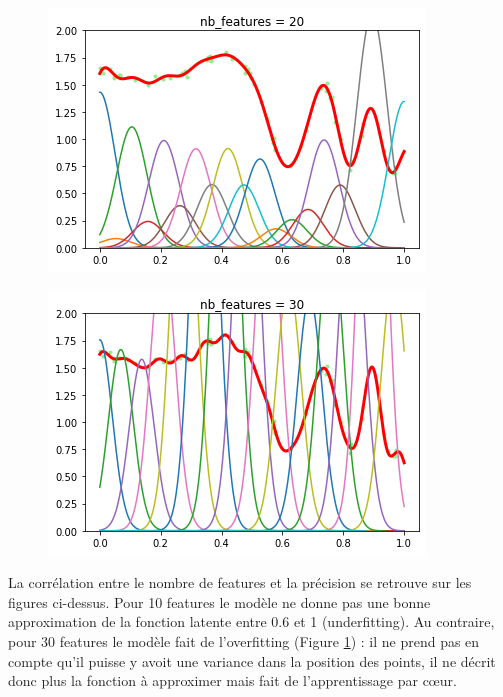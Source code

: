 \documentclass[french,12pt]{article}
\begin{document}
\begin{figure}[ht]
\begin{minipage}{.45\textwidth}
	\centering
	\includegraphics[width=\textwidth]{overfitting_20.png}
	\label{fig:overfitting_20}
\end{minipage}
\hfill
\begin{minipage}{.45\textwidth}
	\centering
	\includegraphics[width=\textwidth]{overfitting_30.png}
	\label{fig:overfitting_30}
\end{minipage}
\end{figure}

La corrélation entre le nombre de features et la précision se retrouve sur les figures ci-dessus. Pour 10 features le modèle ne donne pas une bonne approximation de la fonction latente entre 0.6 et 1 (underfitting). Au contraire, pour 30 features le modèle fait de l'overfitting (Figure \ref{fig:overfitting_30}) : il ne prend pas en compte qu'il puisse y avoit une variance dans la position des points, il ne décrit donc plus la fonction à approximer mais fait de l'apprentissage par c\oe{ur}.
\end{document}
